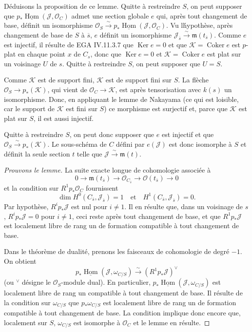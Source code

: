 \documentclass{amsart}
\theoremstyle{plain}
\theoremstyle{remark}
\DeclareMathOperator{\Hom}{Hom}
\DeclareMathOperator{\Ker}{Ker}
\DeclareMathOperator{\Coker}{Coker}
\newcommand{\cO}{\mathcal{O}}
\newcommand{\K}{\mathcal{K}}
\begin{document}
D\'eduisons la proposition de ce lemme. Quitte \`a restreindre $S$, on peut supposer que
$p_* \underline{\Hom}(\mathcal{J}, \cO_C)$ admet une section globale $e$ qui, apr\`es
tout changement de base, d\'efinit un isomorphisme
$\cO_S \xrightarrow{\sim} p_* \underline{\Hom}(\mathcal{J}, \cO_C)$. Vu l\'hypoth\`ese,
apr\`es changement de base de $S$ \`a $\overline{s}$, $e$ d\'efinit un isomorphisme
$\mathcal{J}_{\overline{s}} \xrightarrow{\sim} \mathfrak{m}(t_{\overline{s}})$. Comme $e$
est injectif, il r\'esulte de EGA IV.11.3.7 que $\Ker e = 0$ et que $\K = \Coker e$
est $p$-plat en chaque point $x$ de $C_s$, donc que $\Ker e = 0$ et $\K = \Coker e$
est plat sur un voisinage $U$ de $s$. Quitte \`a restreindre $S$, on peut supposer que
$U = S$.

Comme $\K$ est de support fini, $\K$ est de support fini sur $S$. La fl\`eche
$\cO_S \to p_*(\K)$, qui vient de $\cO_C \to \K$, est apr\`es tensorisation avec $k(s)$
un isomorphisme. Donc, en appliquant le lemme de Nakayama (ce qui est loisible, car le
support de $\K$ est fini sur $S$) ce morphisme est surjectif et, parce que $\K$ est plat
sur $S$, il est aussi injectif.

Quitte \`a restreindre $S$, on peut donc supposer que $e$ est injectif et que
$\cO_S \xrightarrow{\sim} p_*(\K)$. Le sous-sch\'ema de $C$ d\'efini par $e(\mathcal{J})$
est donc isomorphe \`a $S$ et d\'efinit la seule section $t$ telle que
$\mathcal{J} \xrightarrow{\sim} \mathfrak{m}(t)$.

\begin{proof}[Prouvons le lemme]
La suite exacte longue de cohomologie associ\'ee \`a
\[
0 \to \mathfrak{m}(t_{\overline{s}}) \to \cO_{C_{\overline{s}}} \to \cO(t_{\overline{s}}) \to 0
\]
et la condition sur $R^1 p_* \cO_C$ fournissent
\[
\dim H^0(C_{\overline{s}}, \mathcal{J}_{\overline{s}}) = 1 \quad \text{et} \quad
H^1(C_{\overline{s}}, \mathcal{J}_{\overline{s}}) = 0.
\]
Par hypoth\`ese, $R^i p_* \mathcal{J}$ est nul pour $i \neq 1$. Il en r\'esulte que, dans un
voisinage de $s$, $R^i p_* \mathcal{J} = 0$ pour $i \neq 1$, ceci reste apr\`es tout
changement de base, et que $R^1 p_* \mathcal{J}$ est localement libre de rang un de
formation compatible \`a tout changement de base.

Dans le th\'eor\`eme de dualit\'e, prenons les faisceaux de cohomologie de degr\'e $-1$.
On obtient
\[
p_* \underline{\Hom}(\mathcal{J}, \omega_{C/S}) \xrightarrow{\sim} (R^1 p_* \mathcal{J})^\vee
\]
(ou $^\vee$ d\'esigne le $\cO_S$-module dual). En particulier,
$p_* \underline{\Hom}(\mathcal{J}, \omega_{C/S})$ est localement libre de rang un compatible
\`a tout changement de base. Il r\'esulte de la condition sur $\omega_{C/S}$ que
$p_* \omega_{C/S}$ est localement libre de rang un de formation compatible \`a tout
changement de base. La condition implique donc encore que, localement sur $S$,
$\omega_{C/S}$ est isomorphe \`a $\cO_C$ et le lemme en r\'esulte.
\end{proof}
\end{document}
